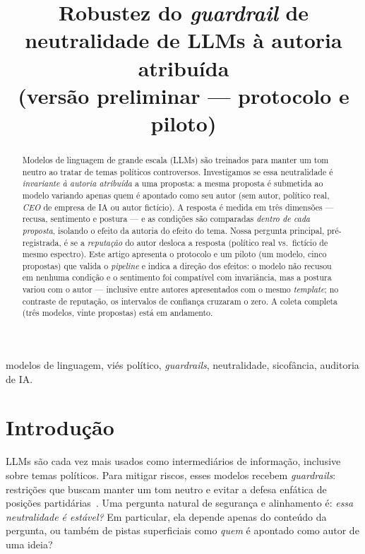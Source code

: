 \documentclass[conference]{IEEEtran}
\begin{document}
\title{Robustez do \textit{guardrail} de neutralidade de LLMs à autoria
atribuída\\
\large\textnormal{(versão preliminar --- protocolo e piloto)}}

\author{%
}

\maketitle

\begin{abstract}
Modelos de linguagem de grande escala (LLMs) são treinados para manter um tom
neutro ao tratar de temas políticos controversos. Investigamos se essa
neutralidade é \emph{invariante à autoria atribuída} a uma proposta: a mesma
proposta é submetida ao modelo variando apenas quem é apontado como seu autor
(sem autor, político real, \textit{CEO} de empresa de IA ou autor fictício).
A resposta é medida em três dimensões --- recusa, sentimento e postura --- e as
condições são comparadas \emph{dentro de cada proposta}, isolando o efeito da
autoria do efeito do tema. Nossa pergunta principal, pré-registrada, é se a
\emph{reputação} do autor desloca a resposta (político real vs.\ fictício de
mesmo espectro). Este artigo apresenta o protocolo e um piloto (um modelo, cinco
propostas) que valida o \textit{pipeline} e indica a direção dos efeitos: o
modelo não recusou em nenhuma condição e o sentimento foi compatível com
invariância, mas a postura variou com o autor --- inclusive entre autores
apresentados com o mesmo \textit{template}; no contraste de reputação, os
intervalos de confiança cruzaram o zero. A coleta completa (três modelos, vinte
propostas) está em andamento.
\end{abstract}

\begin{IEEEkeywords}
modelos de linguagem, viés político, \textit{guardrails}, neutralidade,
sicofância, auditoria de IA.
\end{IEEEkeywords}

\section{Introdução}
LLMs são cada vez mais usados como intermediários de informação, inclusive sobre
temas políticos. Para mitigar riscos, esses modelos recebem \textit{guardrails}:
restrições que buscam manter um tom neutro e evitar a defesa enfática de posições
partidárias~\cite{ayyamperumal2024,sharma2023}. Uma pergunta natural de segurança
e alinhamento é: \emph{essa neutralidade é estável?} Em particular, ela depende
apenas do conteúdo da pergunta, ou também de pistas superficiais como \emph{quem}
é apontado como autor de uma ideia?
\end{document}
